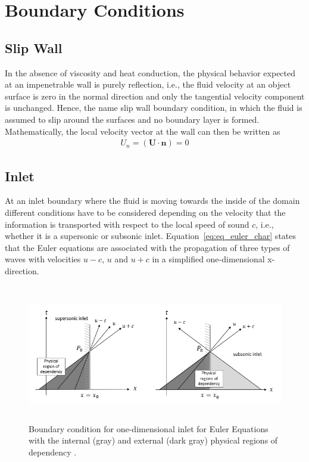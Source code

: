 \section{Boundary Conditions}

\subsection{Slip Wall}
In the absence of viscosity and heat conduction, the physical behavior expected at an impenetrable wall is purely reflection, i.e., the fluid velocity at an object surface is zero in the normal direction and only the tangential velocity component is unchanged. Hence, the name slip wall boundary condition, in which the fluid is assumed to slip around the surfaces and no boundary layer is formed. Mathematically, the local velocity vector at the wall can then be written as
%
\begin{align}
    \label{bc_wall}
    U_n = (\textbf{U} \cdot \textbf{n}) = 0
\end{align}

\subsection{Inlet}
At an inlet boundary where the fluid is moving towards the inside of the domain different conditions have to be considered depending on the velocity that the information is transported with respect to the local speed of sound $c$, i.e., whether it is a supersonic or subsonic inlet. Equation\ \eqref{eq:eq_euler_char} states that the Euler equations are associated with the propagation of three types of waves with velocities $u-c$, $u$ and $u+c$ in a simplified one-dimensional x-direction. 
%
\begin{figure}[htb!]
	\centering
		\includegraphics[height=6.0cm]{figs/boco_inlet_v2.png}
\caption{Boundary condition for one-dimensional inlet for Euler Equations with the internal (gray) and external (dark gray) physical regions of dependency \cite{Hirsch1991}.}
\label{fig:boco_inlet}
\end{figure}


